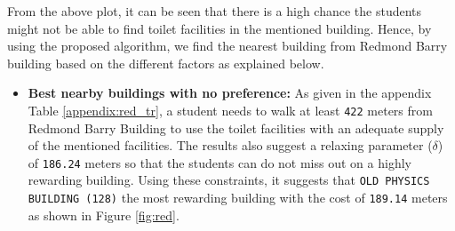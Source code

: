 From the above plot, it can be seen that there is a high chance the students might not be able to find toilet facilities in the mentioned building. Hence, by using the proposed algorithm, we find the nearest building from Redmond Barry building based on the different factors as explained below.
\begin{itemize}
    \item \textbf{Best nearby buildings with no preference:}
    As given in the appendix Table \ref{appendix:red_tr}, a student needs to walk at least \texttt{422} meters from Redmond Barry Building to use the toilet facilities with an adequate supply of the mentioned facilities. The results also suggest a relaxing parameter ($\delta$) of \texttt{186.24} meters so that the students can do not miss out on a highly rewarding building. Using these constraints, it suggests that \texttt{OLD PHYSICS BUILDING (128)}  the most rewarding building with the cost of \texttt{189.14} meters as shown in Figure \ref{fig:red}. 
    

\end{itemize}
